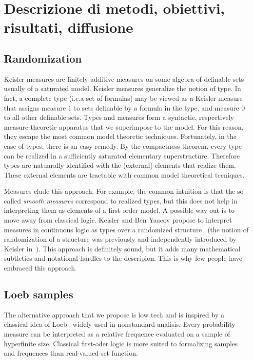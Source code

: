 \documentclass[10pt]{article}
\begin{document}
\section{Descrizione di metodi, obiettivi, risultati, diffusione}

\subsection{Randomization}
Keisler measures are finitely additive measures on some algebra of definable sets usually of a saturated model.
Keisler measures generalize the notion of type. 
In fact, a complete type (i.e.\@ a set of formulas) may be viewed as a Keisler measure that assigns measure $1$ to sets definable by a formula in the type, and measure $0$ to all other definable sets.
Types and measures form a syntactic, respectively measure-theoretic apparatus that we superimpose to the model. 
For this reason, they escape the most common model theoretic techniques.
Fortunately, in the case of types, there is an easy remedy.
By the compactness theorem, every type can be realized in a sufficiently saturated elementary superstructure.
Therefore types are natuarally identified with the (external) elements that realize them.
These external elements are tractable with common model theoretical tecniques.

Measures elude this approach. 
For example, the common intuition is that the so called \textit{smooth measures\/} correspond to realized types, but this does not help in interpreting them as elements of a first-order model.
A possible way out is to move away from classical logic. 
Keisler and Ben Yaacov propose to interpret measures in continuous logic as types over a randomized structure~\cite{MR2561997} (the notion of randomization of a structure was previously and independently introduced by Keisler in~\cite{MR1680650}).
This approach is definitely sound, but it adds many mathematical subtleties and notational hurdles to the descripion.
This is why few people have embraced this approach.

\subsection{Loeb samples}

The alternative approach that we propose is low tech and is inspired by a classical idea of Loeb~\cite{MR1680650} widely used in nonstandard analisis.
Every probability measure can be interpreted as a relative frequence evaluated on a sample of hyperfinite size.
Classical first-oder logic is more suited to formalizing samples and frequences than real-valued set function.
\end{document}
